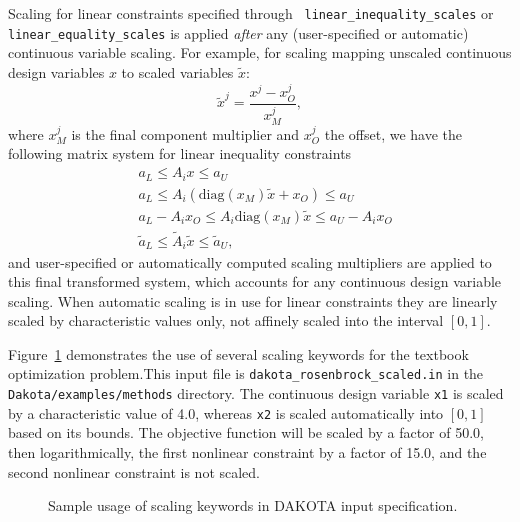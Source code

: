 Scaling for linear constraints specified through {\tt
linear\_inequality\_scales} or {\tt linear\_equality\_scales} is
applied {\em after} any (user-specified or automatic) continuous
variable scaling.  For example, for scaling mapping unscaled
continuous design variables $x$ to scaled variables $\tilde{x}$:
\[ \tilde{x}^j = \frac{x^j - x^j_O}{x^j_M}, \]
where $x^j_M$ is the final component multiplier and $x^j_O$ the
offset, we have the following matrix system for linear inequality
constraints
\begin{eqnarray*}
& a_L \leq A_i x \leq a_U \\
& a_L \leq A_i \left( \mathrm{diag}(x_M) \tilde{x} + x_O \right) \leq a_U \\
& a_L - A_i x_O \leq A_i \mathrm{diag}(x_M) \tilde{x} \leq a_U - A_i x_O \\
& \tilde{a}_L \leq \tilde{A}_i \tilde{x} \leq \tilde{a}_U,
\end{eqnarray*}
and user-specified or automatically computed scaling multipliers are
applied to this final transformed system, which accounts for any
continuous design variable scaling.  When automatic scaling is in use
for linear constraints they are linearly scaled by characteristic
values only, not affinely scaled into the interval $[0,1]$.

Figure~\ref{opt:additional:scaling:figure01} demonstrates the use of
several scaling keywords for the textbook optimization problem.This input file is \texttt{dakota\_rosenbrock\_scaled.in} 
in the \texttt{Dakota/examples/methods} directory.  The
continuous design variable {\tt x1} is scaled by a characteristic
value of 4.0, whereas {\tt x2} is scaled automatically into $[0,1]$
based on its bounds.  The objective function will be scaled by a
factor of 50.0, then logarithmically, the first nonlinear constraint
by a factor of 15.0, and the second nonlinear constraint is not
scaled.

\begin{figure}
\centering
\begin{bigbox}
\begin{small}
\end{small}
\end{bigbox}
\caption{Sample usage of scaling keywords in DAKOTA input specification.}
\label{opt:additional:scaling:figure01}
\end{figure}
